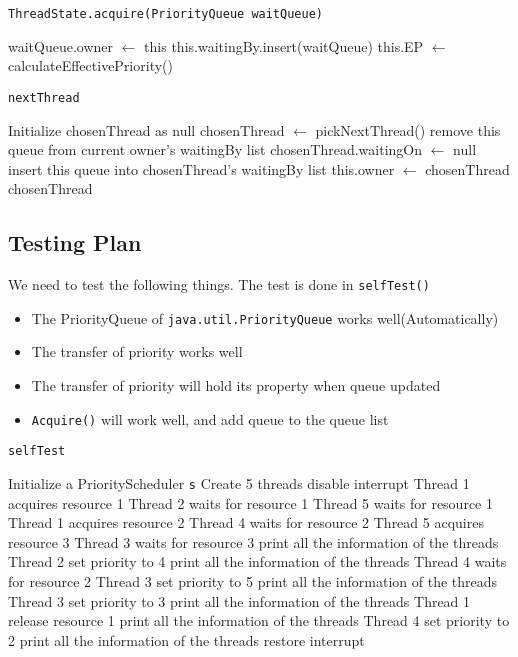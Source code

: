 \documentclass{article}
\begin{document}
\begin{spacing}{1.1}
\begin{algorithm}[htbp]
  \caption{\texttt{ThreadState.acquire(PriorityQueue waitQueue)}}
\begin{algorithmic}[1]
  \STATE waitQueue.owner $\leftarrow$ this
  \STATE this.waitingBy.insert(waitQueue)
  \STATE this.EP $\leftarrow$ calculateEffectivePriority()  
\RETURN
\end{algorithmic}
\end{algorithm}

\begin{algorithm}[htbp]
  \caption{\texttt{nextThread}}
\begin{algorithmic}[1]
  \STATE Initialize chosenThread as null
  \STATE chosenThread $\leftarrow$ pickNextThread()
    \STATE remove this queue from current owner's waitingBy list
    \STATE chosenThread.waitingOn $\leftarrow$ null
    \STATE insert this queue into chosenThread's waitingBy list
  \ENDIF
  \STATE this.owner $\leftarrow$ chosenThread
\RETURN chosenThread
\end{algorithmic}
\end{algorithm}

\subsection{Testing Plan}
We need to test the following things. The test is done in \texttt{selfTest()}
\begin{itemize}
\item The PriorityQueue of \texttt{java.util.PriorityQueue} works well(Automatically)
\item The transfer of priority works well
\item The transfer of priority will hold its property when queue updated
\item \texttt{Acquire()} will work well, and add queue to the queue list
\end{itemize}

\begin{algorithm}[htbp]
  \caption{\texttt{selfTest}}
\begin{algorithmic}[1]
  \STATE Initialize a PriorityScheduler \texttt{s}
  \STATE Create 5 threads
  \STATE disable interrupt
  \STATE
  \STATE Thread 1 acquires resource 1
  \STATE Thread 2 waits for resource 1
  \STATE Thread 5 waits for resource 1
  \STATE Thread 1 acquires resource 2
  \STATE Thread 4 waits for resource 2
  \STATE Thread 5 acquires resource 3
  \STATE Thread 3 waits for resource 3
  \STATE print all the information of the threads
  \STATE
  \STATE Thread 2 set priority to 4
  \STATE print all the information of the threads
  \STATE
  \STATE Thread 4 waits for resource 2
  \STATE Thread 3 set priority to 5
  \STATE print all the information of the threads
  \STATE
  \STATE Thread 3 set priority to 3
  \STATE print all the information of the threads
  \STATE
  \STATE Thread 1 release resource 1
  \STATE print all the information of the threads
  \STATE
  \STATE Thread 4 set priority to 2
  \STATE print all the information of the threads
  \STATE
  \STATE restore interrupt
\end{algorithmic}
\end{algorithm}



\end{spacing}
\end{document}
